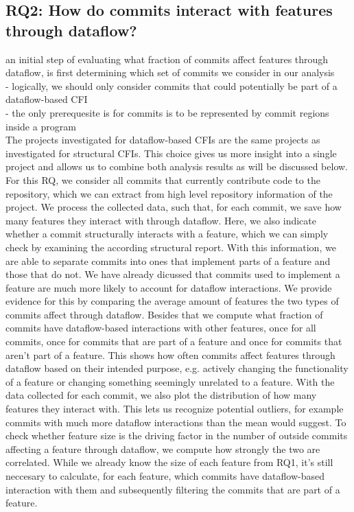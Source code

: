 \subsection*{\textbf{RQ2: How do commits interact with features through dataflow?}}
an initial step of evaluating what fraction of commits affect features through dataflow, is first determining which set of commits we consider in our analysis \\
- logically, we should only consider commits that could potentially be part of a dataflow-based CFI \\
- the only prerequesite is for commits is to be represented by commit regions inside a program \\
The projects investigated for dataflow-based CFIs are the same projects as investigated for structural CFIs.
This choice gives us more insight into a single project and allows us to combine both analysis results as will be discussed below.
For this RQ, we consider all commits that currently contribute code to the repository, 
which we can extract from high level repository information of the project.
We process the collected data, such that, for each commit, we save how many features they interact with through dataflow.
Here, we also indicate whether a commit structurally interacts with a feature, which we can simply check by examining the according structural report.
With this information, we are able to separate commits into ones that implement parts of a feature and those that do not. 
We have already dicussed that commits used to implement a feature are much more likely to account for dataflow interactions.
We provide evidence for this by comparing the average amount of features the two types of commits affect through dataflow. 
Besides that we compute what fraction of commits have dataflow-based interactions with other features, once for all commits, once for commits that are part of a feature and once for commits that aren't part of a feature.
This shows how often commits affect features through dataflow based on their intended purpose, e.g. actively changing the functionality of a feature or changing something seemingly unrelated to a feature. 
With the data collected for each commit, we also plot the distribution of how many features they interact with.
This lets us recognize potential outliers, for example commits with much more dataflow interactions than the mean would suggest.
To check whether feature size is the driving factor in the number of outside commits affecting a feature through dataflow, we compute how strongly the two are correlated.
While we already know the size of each feature from RQ1, it's still neccesary to calculate, for each feature, which commits have dataflow-based interaction with them and subsequently filtering the commits that are part of a feature.

